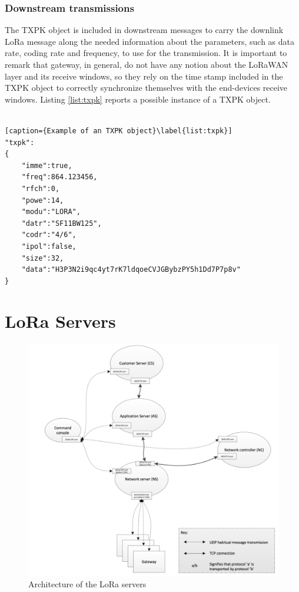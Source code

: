 \subsubsection{Downstream transmissions}
The TXPK object is included in downstream messages to carry the downlink LoRa message along the needed information about the parameters, such as data rate, coding rate and frequency, to use for the transmission. It is important to remark that gateway, in general, do not have any notion about the LoRaWAN layer and its receive windows, so they rely on the time stamp included in the TXPK object to correctly synchronize themselves with the end-devices receive windows. Listing \ref{list:txpk} reports a possible instance of a TXPK object.
\\
\\
\begin{lstlisting}[caption={Example of an TXPK object}\label{list:txpk}]
"txpk":
{
	"imme":true,
	"freq":864.123456,
	"rfch":0,
	"powe":14,
	"modu":"LORA",
	"datr":"SF11BW125",
	"codr":"4/6",
	"ipol":false,
	"size":32,
	"data":"H3P3N2i9qc4yt7rK7ldqoeCVJGBybzPY5h1Dd7P7p8v"
}
\end{lstlisting}

\section{LoRa Servers}
\label{sec:loraservers}
\begin{figure}[]
\centering
\includegraphics[width=\textwidth]{img/server_flow}
\caption{Architecture of the LoRa servers}
\end{figure}


